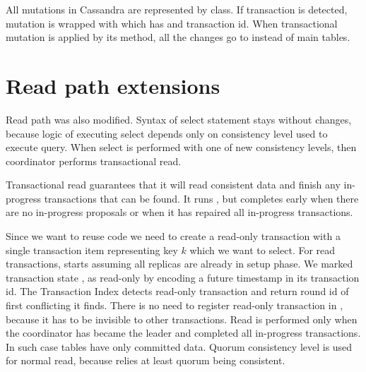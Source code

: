All mutations in Cassandra are represented by  class. If transaction \transaction is detected, mutation is wrapped with  which has  and transaction id.
When transactional mutation is applied by its  method, all the changes go to \txStorage instead of main tables.

\section{Read path extensions}
Read path \cite{CassandraReadPath} was also modified. 
Syntax of select statement stays without changes, because logic of executing select depends only on consistency level used to execute query. When select is performed with one of new consistency levels, then coordinator performs transactional read.


Transactional read guarantees that it will read consistent data and finish any in-progress transactions that can be found. It runs \mpt, but completes early when there are no in-progress proposals or when it has repaired all in-progress transactions.


Since we want to reuse \mpt code we need to create a read-only transaction with a single transaction item \txItem representing key $k$ which we want to select. For read transactions, \mpt starts assuming all replicas are already in setup phase. 
We marked transaction state \txState, as read-only \txState by encoding a future timestamp in its transaction id.
The Transaction Index \txIndex detects read-only transaction and return \paxos round id \paxosRoundId of first conflicting \txState it finds. There is no need to register read-only transaction in \txIndex, because it has to be invisible to other transactions.
Read is performed only when the coordinator has became the leader and completed all in-progress transactions. In such case tables have only committed data. Quorum consistency level is used for normal read, because \mpt relies at least quorum being consistent.



